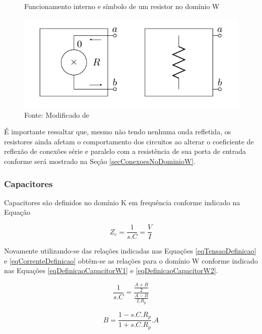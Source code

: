 	\begin{figure}[h]
		\label{figResistorDominioW}
		\caption{Funcionamento interno e símbolo de um resistor no domínio W}
		\includegraphics[scale=0.5]{images/resistor}
		\centering
		\caption*{Fonte: Modificado de \cite{Bogason2017}}
	\end{figure}
	
	É importante ressaltar que, mesmo não tendo nenhuma onda refletida, os resistores ainda afetam o comportamento dos circuitos ao alterar o coeficiente de reflexão de conexões série e paralelo com a resistência de sua porta de entrada conforme será mostrado na Seção \ref{secConexoesNoDominioW}.
	
		\subsubsection{Capacitores}
	
	Capacitores são definidos no domínio K em frequência conforme indicado na Equação
	
	\begin{equation}
		\label{eqCapacitorDefinicaoDominioK}
		Z_c = \frac{1}{s.C} = \frac{V}{I}
	\end{equation}
	
	Novamente utilizando-se das relações indicadas nas Equações \ref{eqTensaoDefinicao} e \ref{eqCorrenteDefinicao} obtêm-se as relações para o domínio W conforme indicado nas Equações \ref{eqDefinicaoCapacitorW1} e \ref{eqDefinicaoCapacitorW2}.
	
	\begin{equation}
		\label{eqDefinicaoCapacitorW1}
		\frac{1}{s.C} = \frac{\frac{A+B}{2}}{\frac{A-B}{2.R_p}}
	\end{equation}
	
	\begin{equation}
		\label{eqDefinicaoCapacitorW2}
		B = \frac{1-s.C.R_p}{1+s.C.R_p}.A
	\end{equation}
	
